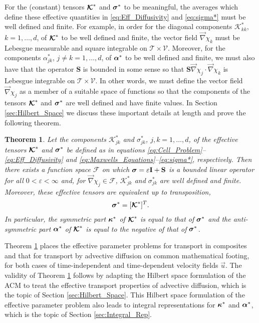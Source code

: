\documentclass[11pt]{amsart}
\newcommand{\Ib}{\mathbf{I}}
\newcommand{\Sb}{\mathbf{S}}
\newcommand{\Kc}{\mathcal{K}}
\newcommand\Kbc{\mbox{\boldmath${\mathcal{K}}$}}
\newcommand{\Tc}{\mathcal{T}}
\newcommand{\Vc}{\mathcal{V}}
\newcommand{\Fs}{\mathscr{F}}
\newcommand\bsig{\mbox{\boldmath${\sigma}$}}
\newcommand\balpha{\mbox{\boldmath${\alpha}$}}
\newcommand\bkappa{\mbox{\boldmath${\kappa}$}}
\newtheorem{theorem}{Theorem}[section]
\begin{document}
For the (constant) tensors $\Kbc^*$ and $\bsig^*$ to be
meaningful, the averages which define these effective quantities in
\eqref{eq:Eff_Diffusivity} and \eqref{eq:sigma*} must be well defined
and finite. For example, in order for the diagonal components
$\Kc^*_{kk}$, $k=1,\ldots,d$, of $\Kbc^*$ to be well defined and finite,
the vector field $\vec{\nabla}\chi_k$ must be Lebesgue measurable 
and square integrable on $\Tc\times\Vc$. Moreover, for the components
$\alpha^*_{jk}$, $j\neq k=1,\ldots,d$, of $\balpha^*$ to be well defined and
finite, we must also have that the operator $\Sb$ is bounded in some
sense so that $\Sb\vec{\nabla}\chi_j\cdot\vec{\nabla}\chi_k$ is Lebesgue integrable on
$\Tc\times\Vc$. In other words, we must define the vector field
$\vec{\nabla}\chi_j$ as a member of a suitable space of functions so that the
components of the tensors $\Kbc^*$ and $\bsig^*$ are well defined and
have finite values. In Section \ref{sec:Hilbert_Space} we discuss
these important details at length and prove the following theorem. 
%
\begin{theorem}\label{thm:kappa_sigma}
%
Let the components $\Kc^*_{jk}$ and $\sigma^*_{jk}$, $j,k=1,\ldots,d$, of the
effective tensors $\Kbc^*$ and $\bsig^*$ be defined as in equations
\eqref{eq:Cell_Problem}--\eqref{eq:Eff_Diffusivity} and
\eqref{eq:Maxwells_Equations}--\eqref{eq:sigma*}, respectively. Then
there exists a function space $\Fs$ on which $\bsig=\varepsilon\Ib+\Sb$ is a
bounded linear operator for all $0<\varepsilon<\infty$ and, for $\vec{\nabla}\chi_j\in\Fs$,
$\Kc^*_{jk}$ and $\sigma^*_{jk}$ are well defined and finite.
Moreover, these effective tensors are
equivalent up to transposition,  
% 
\begin{align}\label{eq:Eff_Equiv}
  \bsig^*=[\Kbc^*]^T.
\end{align}
%
In particular, the symmetric part $\bkappa^*$ of $\Kbc^*$ is equal to
that of $\bsig^*$ and the anti-symmetric part $\balpha^*$ of $\Kbc^*$
is equal to the negative of that of $\bsig^*$.
%
\end{theorem}
%



Theorem \ref{thm:kappa_sigma} places the effective parameter problems
for transport in composites and that for transport by advective
diffusion on common mathematical footing, for both cases of  
time-independent and time-dependent velocity fields $\vec{u}$. The
validity of Theorem \ref{thm:kappa_sigma} follows by adapting the
Hilbert space formulation of the ACM to treat the effective transport
properties of advective diffusion, which is the topic of Section
\ref{sec:Hilbert_Space}. This Hilbert space formulation of the
effective parameter problem also leads to integral representations for
$\bkappa^*$ and $\balpha^*$, which is the topic of Section
\ref{sec:Integral_Rep}.              
\end{document}
